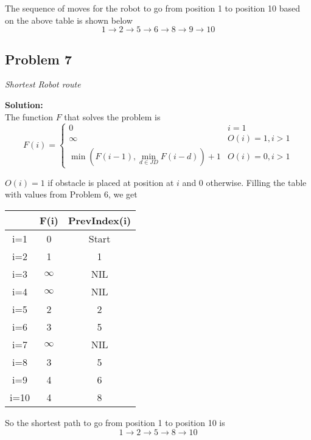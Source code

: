 \documentclass[12pt,a4paper]{article}
\newcommand{\solution}{\noindent\textbf{Solution:}\\\indent}
\begin{document}
The sequence of moves for the robot to go from position 1 to position 10 based on the above table is shown below
\begin{equation*}
    1 \rightarrow 2 \rightarrow 5 \rightarrow 6 \rightarrow 8 \rightarrow 9 \rightarrow 10
\end{equation*}

\newpage
\subsection*{Problem 7}
\textit{
    Shortest Robot route
}

\solution
The function $F$ that solves the problem is
\begin{equation*}
    F(i) = \begin{cases}
        0 & i=1 \\
        \infty & O(i) = 1, i>1 \\
        \min(F(i-1), \min\limits_{d\in JD}F(i-d)) + 1 & O(i) = 0, i>1
    \end{cases}
\end{equation*}

$O(i) = 1$ if obstacle is placed at position at $i$ and 0 otherwise. Filling the table with values from Problem 6, we get

\begin{tabular}{|c|c|c|}
\hline
& F(i) & PrevIndex(i) \\
\hline
i=1 & 0 & Start\\
\hline
i=2 & 1 & 1 \\
\hline
i=3 & $\infty$ & NIL \\
\hline
i=4 & $\infty$ & NIL \\
\hline
i=5 & 2 & 2 \\
\hline
i=6 & 3 & 5 \\
\hline
i=7 & $\infty$ & NIL \\
\hline
i=8 & 3 & 5\\
\hline
i=9 & 4 & 6 \\
\hline
i=10 & 4 & 8 \\
\hline
\end{tabular}

So the shortest path to go from position 1 to position 10 is 
\begin{equation}
    1 \rightarrow 2 \rightarrow 5 \rightarrow 8 \rightarrow 10
\end{equation}
\end{document}
